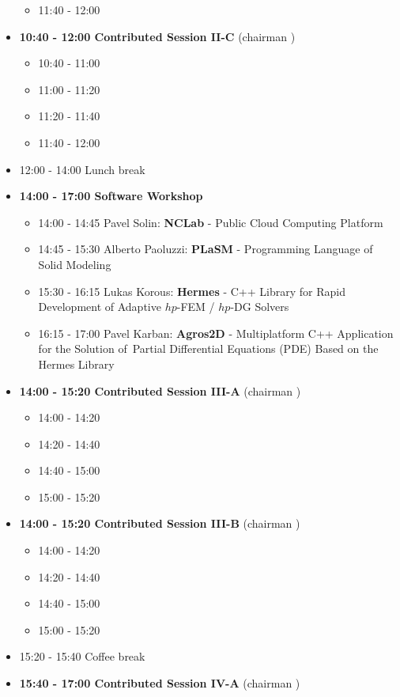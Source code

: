 \documentclass[10pt, A4]{article}%
\begin{document}
\begin{itemize}
\begin{itemize}
    \item 11:40 - 12:00  
  \end{itemize}
  \item {\bf 10:40 - 12:00 Contributed Session II-C} (chairman ) 
  \begin{itemize}
    \item 10:40 - 11:00
    \item 11:00 - 11:20 
    \item 11:20 - 11:40 
    \item 11:40 - 12:00 
  \end{itemize}
  \item 12:00 - 14:00 Lunch break
  \item {\bf 14:00 - 17:00 Software Workshop}
  \begin{itemize}
    \item 14:00 - 14:45 Pavel Solin: {\bf NCLab} - Public Cloud Computing Platform
    \item 14:45 - 15:30 Alberto Paoluzzi: {\bf PLaSM} - Programming Language of Solid Modeling
    \item 15:30 - 16:15 Lukas Korous: {\bf Hermes} - C++ Library for Rapid Development of Adaptive $hp$-FEM / $hp$-DG Solvers
    \item 16:15 - 17:00 Pavel Karban: {\bf Agros2D} - Multiplatform C++ Application for the Solution of~Partial Differential Equations (PDE) Based on the Hermes Library  
  \end{itemize}
  \item {\bf 14:00 - 15:20 Contributed Session III-A} (chairman ) 
  \begin{itemize}
    \item 14:00 - 14:20 
    \item 14:20 - 14:40 
    \item 14:40 - 15:00
    \item 15:00 - 15:20  
  \end{itemize}
  \item {\bf 14:00 - 15:20 Contributed Session III-B} (chairman ) 
  \begin{itemize}
    \item 14:00 - 14:20 
    \item 14:20 - 14:40 
    \item 14:40 - 15:00
    \item 15:00 - 15:20  
  \end{itemize}
  \item 15:20 - 15:40 Coffee break
  \item {\bf 15:40 - 17:00 Contributed Session IV-A} (chairman ) 

\end{itemize}
\end{document}
